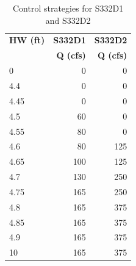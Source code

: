 \footnotesize
\begin{table}[!h]
\centering
\caption{Control strategies for S332D1 and S332D2}
\label{tab:CS-S332D}
\begin{tabular}{l|rr}
\hline
\textbf{HW (ft)} &  \textbf{S332D1} & \textbf{S332D2}\\
\textbf{       } & \textbf{Q (cfs)} & \textbf{Q (cfs)}\\
\hline
0	     &    0    &  0   \\
4.4	     &    0    &  0   \\
4.45	 &    0    &  0   \\
4.5	     &    60   &  0   \\
4.55	 &    80   &  0   \\
4.6	     &    80  &  125 \\
4.65	 &    100  &  125 \\
4.7	     &    130  &  250 \\
4.75     &    165  &  250 \\
4.8	     &    165  &  375 \\
4.85     &    165  &  375 \\
4.9	     &    165  &  375 \\
10	     &    165  &  375 \\
\hline
\end{tabular}
\end{table}
\normalsize




%
%


